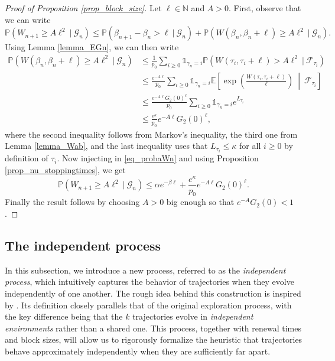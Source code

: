 \documentclass[a4paper, 11pt]{article}
\theoremstyle{plain}
\theoremstyle{definition}
\newcommand{\E}{\mathbb{E}}
\newcommand{\N}{\mathbb{N}}
\renewcommand{\P}{\mathbb{P}}
\numberwithin{equation}{section}
\begin{document}
\begin{proof}[Proof of Proposition \ref{prop_block_size}]
    Let $\ell\in\N$ and $A>0$. First, observe that we can write
        \begin{equation}
            \label{eq_probaWn}
            \P(W_{n+1}\geq A\ell^2~|~\mathcal G_n)\leq\P(\beta_{n+1}-\beta_n>\ell~|~\mathcal G_n)+\P(W(\beta_n,\beta_n+\ell)\geq A\ell^2~|~\mathcal G_n).
        \end{equation}
    Using Lemma \ref{lemma_EGn}, we can then write
        \begin{equation*}
            \begin{split}
                \P(W(\beta_n,\beta_n+\ell)\geq A\ell^2~|~\mathcal G_n)&\leq\frac{1}{p_0}\sum_{i\geq0}\mathds 1_{\gamma_n=i}\P(W(\tau_i,\tau_i+\ell)>A\ell^2~|~\mathcal F_{\tau_i})\\
                &\leq\frac{e^{-A\ell}}{p_0}\sum_{i\geq0}\mathds 1_{\gamma_n=i}\E\left[\exp\left(\frac{W(\tau_i,\tau_i+\ell)}{\ell}\right)~\middle|~\mathcal F_{\tau_i}\right]\\
                &\leq\frac{e^{-A\ell}G_2(0)^\ell}{p_0}\sum_{i\geq0}\mathds 1_{\gamma_n=i}e^{L_{\tau_i}}\\
                &\leq\frac{e^\kappa}{p_0}e^{-A\ell}G_2(0)^\ell,
            \end{split}
        \end{equation*}
    where the second inequality follows from Markov's inequality, the third one from Lemma \ref{lemma_Wab}, and the last inequality uses that $L_{\tau_i}\leq\kappa$ for all $i\geq0$ by definition of $\tau_i$. Now injecting in \eqref{eq_probaWn} and using Proposition \ref{prop_nu_stoppingtimes}, we get
        \[\P(W_{n+1}\geq A\ell^2~|~\mathcal G_n)\leq\alpha e^{-\beta \ell}+\frac{e^\kappa}{p_0}e^{-A\ell}G_2(0)^\ell.\]
    Finally the result follows by choosing $A>0$ big enough so that $e^{-A}G_2(0)<1$.
\end{proof}


\subsection{The independent process}

\label{subsection_independent_process}

In this subsection, we introduce a new process, referred to as the \emph{independent process}, which intuitively captures the behavior of trajectories when they evolve independently of one another. The rough idea behind this construction is inspired by \cite{DiscreteDsf}. Its definition closely parallels that of the original exploration process, with the key difference being that the $k$ trajectories evolve in \emph{independent environments} rather than a shared one. This process, together with renewal times and block sizes, will allow us to rigorously formalize the heuristic that trajectories behave approximately independently when they are sufficiently far apart.\\
\end{document}
